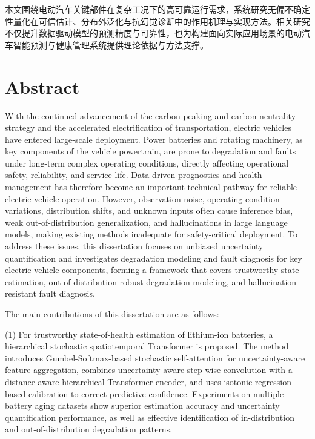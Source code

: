 本文围绕电动汽车关键部件在复杂工况下的高可靠运行需求，系统研究无偏不确定性量化在可信估计、分布外泛化与抗幻觉诊断中的作用机理与实现方法。相关研究不仅提升数据驱动模型的预测精度与可靠性，也为构建面向实际应用场景的电动汽车智能预测与健康管理系统提供理论依据与方法支撑。


\chapter[Abstract]{{\rmfamily Abstract}}%

With the continued advancement of the carbon peaking and carbon neutrality strategy and the accelerated electrification of transportation, electric vehicles have entered large-scale deployment. Power batteries and rotating machinery, as key components of the vehicle powertrain, are prone to degradation and faults under long-term complex operating conditions, directly affecting operational safety, reliability, and service life. Data-driven prognostics and health management has therefore become an important technical pathway for reliable electric vehicle operation. However, observation noise, operating-condition variations, distribution shifts, and unknown inputs often cause inference bias, weak out-of-distribution generalization, and hallucinations in large language models, making existing methods inadequate for safety-critical deployment. To address these issues, this dissertation focuses on unbiased uncertainty quantification and investigates degradation modeling and fault diagnosis for key electric vehicle components, forming a framework that covers trustworthy state estimation, out-of-distribution robust degradation modeling, and hallucination-resistant fault diagnosis.

The main contributions of this dissertation are as follows:

(1) For trustworthy state-of-health estimation of lithium-ion batteries, a hierarchical stochastic spatiotemporal Transformer is proposed. The method introduces Gumbel-Softmax-based stochastic self-attention for uncertainty-aware feature aggregation, combines uncertainty-aware step-wise convolution with a distance-aware hierarchical Transformer encoder, and uses isotonic-regression-based calibration to correct predictive confidence. Experiments on multiple battery aging datasets show superior estimation accuracy and uncertainty quantification performance, as well as effective identification of in-distribution and out-of-distribution degradation patterns.

